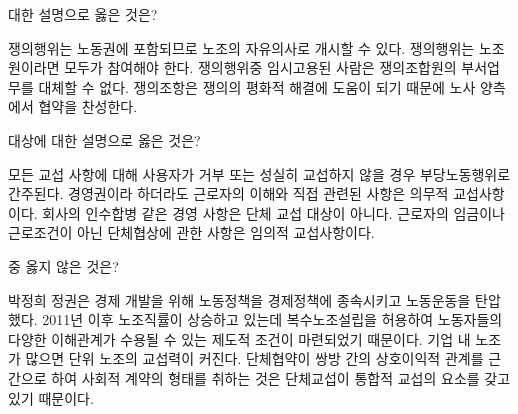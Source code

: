 \documentclass[11pt,]{exam} %
\begin{document}
\begin{questions}
 대한 설명으로 옳은 것은?
    \begin{choices}
    \choice\relax 쟁의행위는 노동권에 포함되므로 노조의 자유의사로 개시할 수 있다.
    \choice\relax 쟁의행위는 노조원이라면 모두가 참여해야 한다.
    \CorrectChoice\relax 쟁의행위중 임시고용된 사람은 쟁의조합원의 부서업무를 대체할 수 없다.
    \choice\relax 쟁의조항은 쟁의의 평화적 해결에 도움이 되기 때문에 노사 양측에서 협약을 찬성한다.
    \end{choices}


 대상에 대한 설명으로 옳은 것은?
    \begin{choices}
    \choice\relax 모든 교섭 사항에 대해 사용자가 거부 또는 성실히 교섭하지 않을 경우 부당노동행위로 간주된다.
    \CorrectChoice\relax 경영권이라 하더라도 근로자의 이해와 직접 관련된 사항은 의무적 교섭사항이다.
    \choice\relax 회사의 인수합병 같은 경영 사항은 단체 교섭 대상이 아니다.
    \choice\relax 근로자의 임금이나 근로조건이 아닌 단체협상에 관한 사항은 임의적 교섭사항이다.
    \end{choices}

 중 옳지 않은 것은?
    \begin{choices}
    \choice\relax 박정희 정권은 경제 개발을 위해 노동정책을 경제정책에 종속시키고 노동운동을 탄압했다.
    \choice\relax 2011년 이후 노조직률이 상승하고 있는데 복수노조설립을 허용하여 노동자들의 다양한 이해관계가 수용될 수 있는 제도적 조건이 마련되었기 때문이다.
    \CorrectChoice\relax 기업 내 노조가 많으면 단위 노조의 교섭력이 커진다.
    \choice\relax 단체협약이 쌍방 간의 상호이익적 관계를 근간으로 하여 사회적 계약의 형태를 취하는 것은 단체교섭이 통합적 교섭의 요소를 갖고 있기 때문이다.
    \end{choices}



\end{questions}
\end{document}

